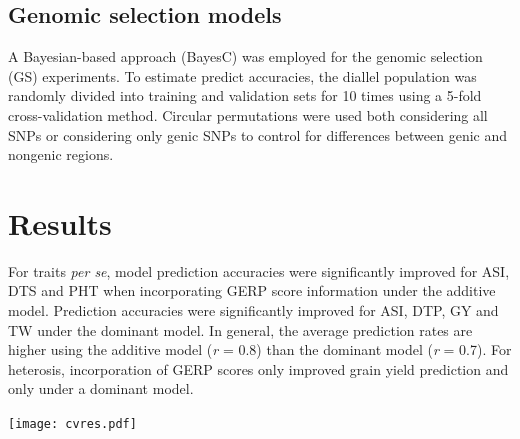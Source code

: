 \documentclass[a0,portrait]{a0poster}
\begin{document}
\begin{multicols}{2}
\subsection*{Genomic selection models}

A Bayesian-based approach (BayesC) \citep{Habier2011} was employed for the genomic selection (GS) experiments. To estimate predict accuracies, the diallel population was randomly divided into training and validation sets for 10 times using a 5-fold cross-validation method. Circular permutations were used both considering all SNPs or considering only genic SNPs to control for differences between genic and nongenic regions.



\section*{Results}

For traits \emph{per se}, model prediction accuracies were significantly improved for ASI, DTS and PHT when incorporating GERP score information under the additive model. Prediction accuracies were significantly improved for ASI, DTP, GY and TW under the dominant model. In general, the average prediction rates are higher using the additive model (\emph{r} = 0.8) than the dominant model (\emph{r} = 0.7). For heterosis, incorporation of GERP scores only improved grain yield prediction and only under a dominant model.  

\begin{center}\vspace{1cm}
\texttt{[image: cvres.pdf]}
\end{center}\vspace{1cm}


\end{multicols}
\end{document}
